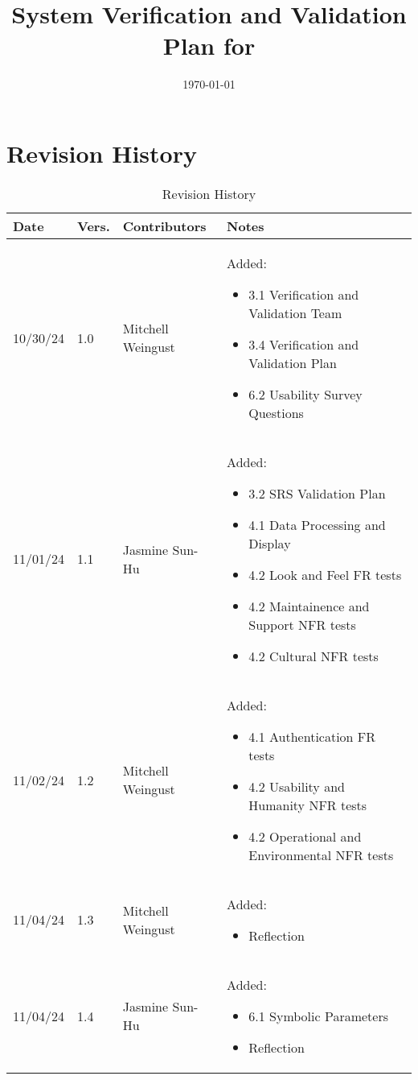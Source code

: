 \documentclass[12pt, titlepage]{article}
\begin{document}
\title{System Verification and Validation Plan for \progname{}} 
\author{\authname}
\date{\today}
	
\maketitle


\section*{Revision History}

\begin{table}[hp]
  \caption{Revision History} \label{TblRevisionHistory}
  \begin{tabularx}{\textwidth}{p{1.5cm}p{1cm}p{3.5cm}X}
  \toprule {\textbf{Date}} & {\textbf{Vers.}} & {\textbf{Contributors}} & {\textbf{Notes}}\\
  \midrule
  10/30/24 & 1.0 & Mitchell Weingust & Added:\begin{itemize}[leftmargin=*]
    \item 3.1 Verification and Validation Team
    \item 3.4 Verification and Validation Plan
    \item 6.2 Usability Survey Questions
  \end{itemize}\\
  11/01/24 & 1.1 & Jasmine Sun-Hu & Added:\begin{itemize}[leftmargin=*]
    \item 3.2 SRS Validation Plan
    \item 4.1 Data Processing and Display
    \item 4.2 Look and Feel FR tests
    \item 4.2 Maintainence and Support NFR tests
    \item 4.2 Cultural NFR tests
  \end{itemize}\\
  11/02/24 & 1.2 & Mitchell Weingust & Added:\begin{itemize}[leftmargin=*]
    \item 4.1 Authentication FR tests
    \item 4.2 Usability and Humanity NFR tests
    \item 4.2 Operational and Environmental NFR tests
  \end{itemize}\\
  11/04/24 & 1.3 & Mitchell Weingust & Added:\begin{itemize}[leftmargin=*]
    \item Reflection
  \end{itemize}\\
  11/04/24 & 1.4 & Jasmine Sun-Hu & Added:\begin{itemize}[leftmargin=*]
    \item 6.1 Symbolic Parameters
    \item Reflection
  \end{itemize}\\
  \bottomrule
  \end{tabularx}
  \end{table}
\end{document}
